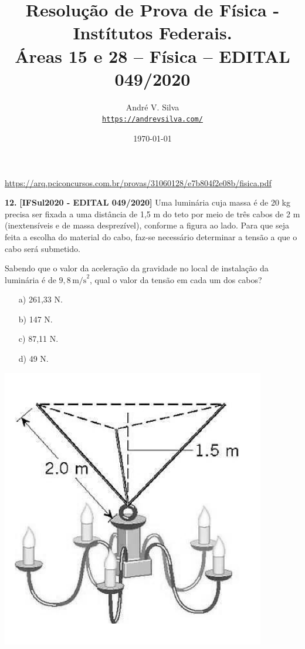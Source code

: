\documentclass[a4paper,12pt]{article}
\title{Resolu\c{c}\~ao de Prova de F\'isica - Inst\'itutos Federais.\\
Áreas 15 e 28 – Física – EDITAL 049/2020}
\author{Andr\'e V. Silva \\
\href{https://andrevsilva.com/}{\texttt{https://andrevsilva.com/}}}
\date{\today}
\begin{document}
\maketitle

\begin{center}
\url{https://arq.pciconcursos.com.br/provas/31060128/e7b804f2e08b/fisica.pdf}
\end{center}

\begin{minipage}{0.6\textwidth}
\textbf{12.} \textbf{[IFSul2020 - EDITAL 049/2020]}  Uma luminária cuja massa é de 20 kg precisa ser 
fixada a uma distância de 1,5 m do teto por meio de três cabos de 2 m (inextensíveis e de massa desprezível), 
conforme a figura ao lado. Para que seja feita a escolha do material do cabo, faz-se necessário determinar a tensão a que o cabo será submetido.

Sabendo que o valor da aceleração da gravidade no local de instalação da luminária é de \(9,8 \, \mathrm{m/s}^2\), qual o valor da tensão em cada um dos cabos?

\begin{itemize}
    \item[a)] 261,33 N.
    \item[b)] 147 N.
    \item[c)] 87,11 N.
    \item[d)] 49 N.
\end{itemize}
\end{minipage}
\hfill
\begin{minipage}{0.35\textwidth}
\centering
\includegraphics[width=\linewidth]{images/luminaria.png} %
\end{minipage}
\end{document}
